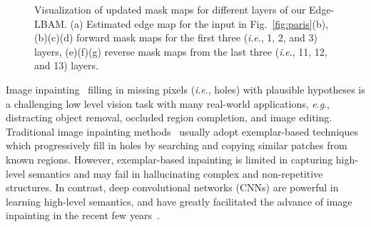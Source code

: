 \documentclass[10pt,journal,compsoc]{IEEEtran}
\newcommand{\ie}{\textit{i}.\textit{e}.}
\newcommand{\eg}{\textit{e}.\textit{g}.}
\begin{document}
\begin{figure}[hbt]
	\caption{Visualization of updated mask maps for different layers of our Edge-LBAM. (a) Estimated edge map for the input in Fig.~\ref{fig:paris}(b), (b)(c)(d) forward mask maps for the first three (\ie, 1, 2, and 3) layers, (e)(f)(g) reverse mask maps from the last three (\ie, 11, 12, and 13) layers.
}
		\label{fig:paris_visual}
	\end{figure}

%

Image inpainting~\cite{BertalmioInpainting} filling in missing pixels (\ie, holes) with plausible hypotheses is a challenging low level vision task with many real-world applications, \eg, distracting object removal, occluded region completion, and image editing.
%
Traditional image inpainting methods~\cite{criminisi2004region,Barnes:2009:PAR,XuPatchSparsity} usually adopt exemplar-based techniques which progressively fill in holes by searching and copying similar patches from known regions.
%
However, exemplar-based inpainting is limited in capturing high-level semantics and may fail in hallucinating complex and non-repetitive structures.
%
In contrast, deep convolutional networks (CNNs) are powerful in learning high-level semantics, and have greatly facilitated the advance of image inpainting in the recent few years~\cite{pathakCVPR16context,IizukaGL,Yang_2017_CVPR,song_contextual_2018, Yan_2018_Shift,yu2018generative}.


%
%
%
\end{document}
